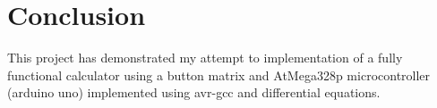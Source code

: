 \documentclass[a4paper,12pt]{article}
\begin{document}
\section*{Conclusion}
This project has demonstrated my attempt to implementation of a fully functional calculator using a button matrix and AtMega328p microcontroller (arduino uno) implemented using avr-gcc and differential equations. 
\end{document}
